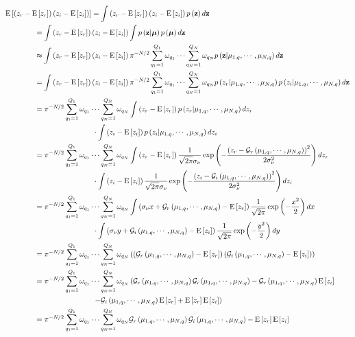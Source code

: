 \documentclass{article}         %
\theoremstyle{definition}
\theoremstyle{remark}
\newcommand{\al}[1]{\begin{align} #1 \end{align}}
\newcommand{\zbf}{\mathbf{z}}
\newcommand{\mubf}{\boldsymbol{\mu}}
\newcommand{\Gscript}{\mathcal{G}}
\newcommand{\paren}[1]{\left(#1\right)}
\newcommand{\expect}[1]{\mathrm{E}\left[#1\right]}
\newcommand{\sumqone}{\sum\limits_{q_1=1}^{Q_1}}
\newcommand{\sumqN}{\sum\limits_{q_N=1}^{Q_N}}
\newcommand{\qq}{\qquad\qquad}
\newcommand{\normpdf}[3]{\frac{1}{\sqrt{2\pi}#3}\exp\paren{-\frac{\paren{#1-#2}^2}{2#3^2}}}
\begin{document}
\al{&\expect{\paren{z_r-\expect{z_r}}\paren{z_i-\expect{z_i}}} = \int\paren{z_r-\expect{z_r}}\paren{z_i-\expect{z_i}}p\paren{\zbf}d\zbf \\
&\qq= \int\paren{z_r-\expect{z_r}}\paren{z_i-\expect{z_i}}\int p\paren{\zbf\middle|\mubf}p\paren{\mubf}d\zbf \\
&\qq\approx \int\paren{z_r-\expect{z_r}}\paren{z_i-\expect{z_i}}\pi^{-N/2}\sumqone\omega_{q_1}\cdots\sumqN\omega_{q_N}p\paren{\zbf\middle|\mu_{1,q},\cdots,\mu_{N,q}}d\zbf \\
&\qq= \int\paren{z_r-\expect{z_r}}\paren{z_i-\expect{z_i}}\pi^{-N/2}\sumqone\omega_{q_1}\cdots\sumqN\omega_{q_N}p\paren{z_r|\mu_{1,q},\cdots,\mu_{N,q}}p\paren{z_i|\mu_{1,q},\cdots,\mu_{N,q}}d\zbf \\
&\qq= \pi^{-N/2}\sumqone\omega_{q_1}\cdots\sumqN\omega_{q_N}\int\paren{z_r-\expect{z_r}}p\paren{z_r|\mu_{1,q},\cdots,\mu_{N,q}}dz_r \notag \\
&\qq\qq\qq\cdot\int\paren{z_i-\expect{z_i}}p\paren{z_i|\mu_{1,q},\cdots,\mu_{N,q}}dz_i \\
&\qq=\pi^{-N/2}\sumqone\omega_{q_1}\cdots\sumqN\omega_{q_N}\int\paren{z_r-\expect{z_r}}\normpdf{z_r}{\Gscript_r\paren{\mu_{1,q},\cdots,\mu_{N,q}}}{\sigma_\nu}dz_r \notag \\
&\qq\qq\qq\cdot\int\paren{z_i-\expect{z_i}}\normpdf{z_i}{\Gscript_i\paren{\mu_{1,q},\cdots,\mu_{N,q}}}{\sigma_\nu}dz_i \\
&\qq=\pi^{-N/2}\sumqone\omega_{q_1}\cdots\sumqN\omega_{q_N}\int\paren{\sigma_\nu x+\Gscript_r\paren{\mu_{1,q},\cdots,\mu_{N,q}}-\expect{z_r}}\frac{1}{\sqrt{2\pi}}\exp\paren{-\frac{x^2}{2}}dx \notag \\
&\qq\qq\qq\cdot\int\paren{\sigma_\nu y+\Gscript_i\paren{\mu_{1,q},\cdots,\mu_{N,q}}-\expect{z_i}}\frac{1}{\sqrt{2\pi}}\exp\paren{-\frac{y^2}{2}}dy \\
&\qq= \pi^{-N/2}\sumqone\omega_{q_1}\cdots\sumqN\omega_{q_N}\paren{\paren{\Gscript_r\paren{\mu_{1,q},\cdots,\mu_{N,q}}-\expect{z_r}}\paren{\Gscript_i\paren{\mu_{1,q},\cdots,\mu_{N,q}}-\expect{z_i}}} \\
&\qq= \pi^{-N/2}\sumqone\omega_{q_1}\cdots\sumqN\omega_{q_N}\left(\Gscript_r\paren{\mu_{1,q},\cdots,\mu_{N,q}}\Gscript_i\paren{\mu_{1,q},\cdots,\mu_{N,q}}-\Gscript_r\paren{\mu_{1,q},\cdots,\mu_{N,q}}\expect{z_i}\right. \notag \\
&\qq\qq\qq\left.-\Gscript_i\paren{\mu_{1,q},\cdots,\mu_{N,q}}\expect{z_r}+\expect{z_r}\expect{z_i}\right) \\
&\qq= \pi^{-N/2}\sumqone\omega_{q_1}\cdots\sumqN\omega_{q_N}\Gscript_r\paren{\mu_{1,q},\cdots,\mu_{N,q}}\Gscript_i\paren{\mu_{1,q},\cdots,\mu_{N,q}}-\expect{z_r}\expect{z_i}}
\end{document}
